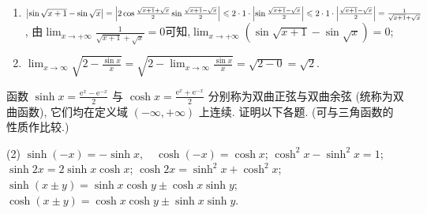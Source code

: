 \begin{solution}
\begin{enumerate}
        \item $\left| \sin \sqrt{x+1}-\sin\sqrt{x} \right| = \left| 2 \cos \frac{\sqrt{x+1}+\sqrt{x}}{2} \sin \frac{\sqrt{x+1}-\sqrt{x}}{2} \right| \leqslant 2 \cdot 1 \cdot \left| \sin \frac{\sqrt{x+1}-\sqrt{x}}{2} \right| \leqslant 2 \cdot 1 \cdot \left| \frac{\sqrt{x+1}-\sqrt{x}}{2} \right| = \frac{1}{\sqrt{x+1}+\sqrt{x}}$, 由$\lim_{x \to +\infty} \frac{1}{\sqrt{x+1}+\sqrt{x}} = 0$可知,$\lim_{x \to +\infty} (\sin\sqrt{x+1}-\sin\sqrt{x}) = 0$;
        \item $\lim_{x \to \infty} \sqrt{2-\frac{\sin x}{x}} = \sqrt{2 - \lim_{x \to \infty} \frac{\sin x}{x}} = \sqrt{2 - 0} = \sqrt{2}$.
    \end{enumerate}
\end{solution}

\begin{exercise}[2.1.18]
    函数 $\sinh x = \frac{\mathrm{e}^x - \mathrm{e}^{-x}}{2}$ 与 $\cosh x = \frac{\mathrm{e}^x + \mathrm{e}^{-x}}{2}$ 分别称为双曲正弦与双曲余弦 (统称为双曲函数), 它们均在定义域 $(-\infty, +\infty)$ 上连续. 证明以下各题. (可与三角函数的性质作比较.)
    \begin{tasks}[label=(\arabic*)](2)
        \task $\sinh(-x) = -\sinh x, \quad \cosh(-x) = \cosh x$;
        \task $\cosh^2 x - \sinh^2 x = 1$;
        \task $\sinh 2x = 2\sinh x \cosh x$;
        \task $\cosh 2x = \sinh^2 x + \cosh^2 x$;
        \task $\sinh(x \pm y) = \sinh x \cosh y \pm \cosh x \sinh y$;
        \task $\cosh(x \pm y) = \cosh x \cosh y \pm \sinh x \sinh y$.
    \end{tasks}
\end{exercise}

